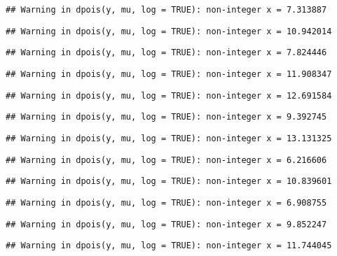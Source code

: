 \documentclass[
]{article}
\begin{document}
\begin{verbatim}
## Warning in dpois(y, mu, log = TRUE): non-integer x = 7.313887
\end{verbatim}

\begin{verbatim}
## Warning in dpois(y, mu, log = TRUE): non-integer x = 10.942014
\end{verbatim}

\begin{verbatim}
## Warning in dpois(y, mu, log = TRUE): non-integer x = 7.824446
\end{verbatim}

\begin{verbatim}
## Warning in dpois(y, mu, log = TRUE): non-integer x = 11.908347
\end{verbatim}

\begin{verbatim}
## Warning in dpois(y, mu, log = TRUE): non-integer x = 12.691584
\end{verbatim}

\begin{verbatim}
## Warning in dpois(y, mu, log = TRUE): non-integer x = 9.392745
\end{verbatim}

\begin{verbatim}
## Warning in dpois(y, mu, log = TRUE): non-integer x = 13.131325
\end{verbatim}

\begin{verbatim}
## Warning in dpois(y, mu, log = TRUE): non-integer x = 6.216606
\end{verbatim}

\begin{verbatim}
## Warning in dpois(y, mu, log = TRUE): non-integer x = 10.839601
\end{verbatim}

\begin{verbatim}
## Warning in dpois(y, mu, log = TRUE): non-integer x = 6.908755
\end{verbatim}

\begin{verbatim}
## Warning in dpois(y, mu, log = TRUE): non-integer x = 9.852247
\end{verbatim}

\begin{verbatim}
## Warning in dpois(y, mu, log = TRUE): non-integer x = 11.744045
\end{verbatim}
\end{document}
